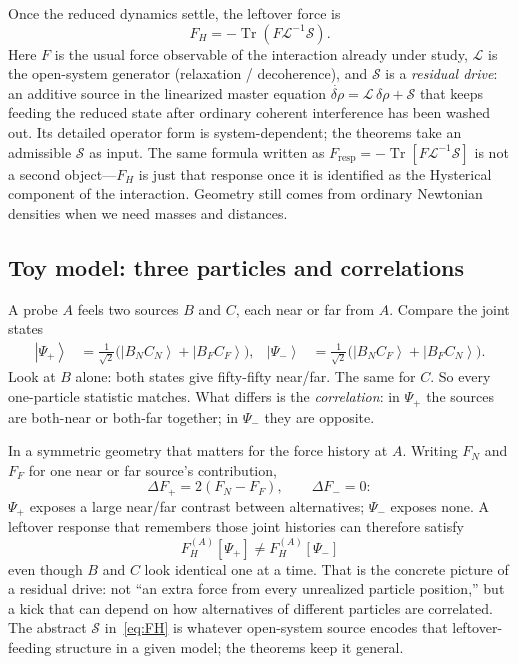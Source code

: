 \documentclass[11pt]{article}
\theoremstyle{remark}
\newcommand{\Tr}{\operatorname{Tr}}
\newcommand{\ket}[1]{\left|#1\right\rangle}
\begin{document}
Once the reduced dynamics settle, the leftover force is
\begin{equation}
  F_H=-\Tr\!\left(F\mathcal L^{-1}\mathcal S\right).
  \label{eq:FH}
\end{equation}
Here $F$ is the usual force observable of the interaction already under study, $\mathcal L$ is the open-system generator (relaxation / decoherence), and $\mathcal S$ is a \emph{residual drive}: an additive source in the linearized master equation $\dot{\delta\rho}=\mathcal L\,\delta\rho+\mathcal S$ that keeps feeding the reduced state after ordinary coherent interference has been washed out.
Its detailed operator form is system-dependent; the theorems take an admissible $\mathcal S$ as input.
The same formula written as $F_{\mathrm{resp}}=-\Tr[F\mathcal L^{-1}\mathcal S]$ is not a second object---$F_H$ is just that response once it is identified as the Hysterical component of the interaction.
Geometry still comes from ordinary Newtonian densities when we need masses and distances.

\subsection*{Toy model: three particles and correlations}
A probe $A$ feels two sources $B$ and $C$, each near or far from $A$. Compare the joint states
\begin{align}
  \ket{\Psi_+}&=\frac{1}{\sqrt2}\bigl(\ket{B_NC_N}+\ket{B_FC_F}\bigr),&
  \ket{\Psi_-}&=\frac{1}{\sqrt2}\bigl(\ket{B_NC_F}+\ket{B_FC_N}\bigr).
\end{align}
Look at $B$ alone: both states give fifty-fifty near/far. The same for $C$. So every one-particle statistic matches.
What differs is the \emph{correlation}: in $\Psi_+$ the sources are both-near or both-far together; in $\Psi_-$ they are opposite.

In a symmetric geometry that matters for the force history at $A$. Writing $F_N$ and $F_F$ for one near or far source's contribution,
\begin{equation}
  \Delta F_+=2(F_N-F_F),\qquad \Delta F_-=0:
\end{equation}
$\Psi_+$ exposes a large near/far contrast between alternatives; $\Psi_-$ exposes none.
A leftover response that remembers those joint histories can therefore satisfy
\begin{equation}
  F_H^{(A)}[\Psi_+]\neq F_H^{(A)}[\Psi_-]
\end{equation}
even though $B$ and $C$ look identical one at a time.
That is the concrete picture of a residual drive: not ``an extra force from every unrealized particle position,'' but a kick that can depend on how alternatives of different particles are correlated.
The abstract $\mathcal S$ in~\eqref{eq:FH} is whatever open-system source encodes that leftover-feeding structure in a given model; the theorems keep it general.
\end{document}
